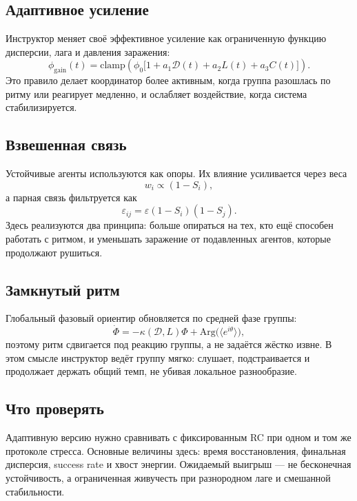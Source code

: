 \subsection{Адаптивное усиление}
Инструктор меняет своё эффективное усиление как ограниченную функцию дисперсии, лага и давления заражения:
\begin{equation}
\phi_{\mathrm{gain}}(t)=\mathrm{clamp}\!\left(\phi_0\bigl[1+a_1\mathcal{D}(t)+a_2L(t)+a_3C(t)\bigr]\right).
\end{equation}
Это правило делает координатор более активным, когда группа разошлась по ритму или реагирует медленно, и ослабляет воздействие, когда система стабилизируется.

\subsection{Взвешенная связь}
Устойчивые агенты используются как опоры. Их влияние усиливается через веса
\begin{equation}
w_i \propto (1-S_i),
\end{equation}
а парная связь фильтруется как
\begin{equation}
\varepsilon_{ij}=\varepsilon(1-S_i)(1-S_j).
\end{equation}
Здесь реализуются два принципа: больше опираться на тех, кто ещё способен работать с ритмом, и уменьшать заражение от подавленных агентов, которые продолжают рушиться.

\subsection{Замкнутый ритм}
Глобальный фазовый ориентир обновляется по средней фазе группы:
\begin{equation}
\dot{\Phi}=-\kappa(\mathcal{D},L)\Phi + \mathrm{Arg}\bigl(\langle e^{i\theta}\rangle\bigr),
\end{equation}
поэтому ритм сдвигается под реакцию группы, а не задаётся жёстко извне. В этом смысле инструктор ведёт группу мягко: слушает, подстраивается и продолжает держать общий темп, не убивая локальное разнообразие.

\subsection{Что проверять}
Адаптивную версию нужно сравнивать с фиксированным RC при одном и том же протоколе стресса. Основные величины здесь: время восстановления, финальная дисперсия, success rate и хвост энергии. Ожидаемый выигрыш --- не бесконечная устойчивость, а ограниченная живучесть при разнородном лаге и смешанной стабильности.
